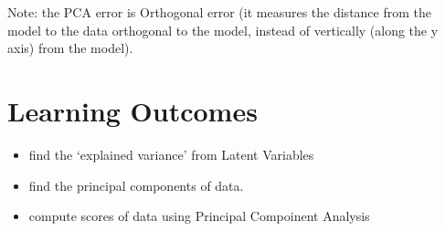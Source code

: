 \documentclass[12pt]{book}
\begin{document}
 Note: the PCA error is Orthogonal error (it measures the distance from the model to the data
 orthogonal to the model, instead of vertically (along the y axis) from the model).

 \section*{Learning Outcomes}
 \begin{itemize}
         \item find the `explained variance' from Latent Variables
         \item find the principal components of data.
         \item compute scores of data using Principal Compoinent Analysis
 \end{itemize}
\end{document}
